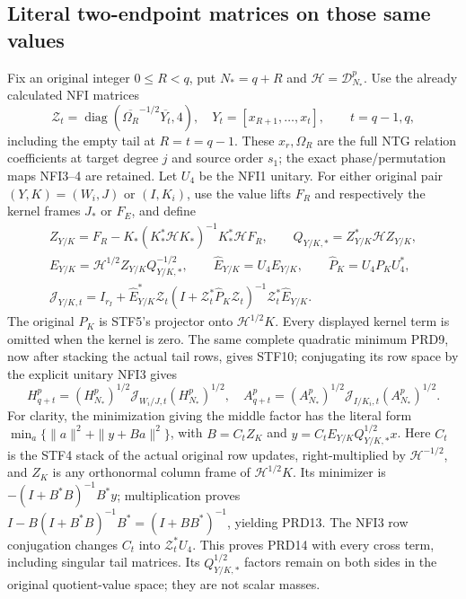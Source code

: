 \documentclass[11pt,a4paper]{article}
\begin{document}
\subsection{Literal two-endpoint matrices on those same values}
Fix an original integer $0\le R<q$, put $N_*=q+R$ and
$\mathcal H=\mathcal D_{N_*}^p$. Use the already calculated
NFI matrices
\[
 \mathscr Z_t=\operatorname{diag}
 (\overline{\Omega_R}^{-1/2}\overline{Y_t},4),\quad
 Y_t=[x_{R+1},\ldots,x_t],\qquad t=q-1,q,                 \tag{PRD12}
\]
including the empty tail at $R=t=q-1$. These $x_r,\Omega_R$
are the full NTG relation coefficients at target degree $j$ and
source order $s_1$; the exact phase/permutation maps NFI3--4 are
retained. Let $U_4$ be the NFI1 unitary. For either original
pair $(Y,K)=(W_i,J)$ or $(I,K_i)$, use the value lifts $F_R$
and respectively the kernel frames $J_*$ or $F_E$, and define
\[
\begin{gathered}
 Z_{Y/K}=F_R-K_*(K_*^*\mathcal H K_*)^{-1}K_*^*\mathcal H F_R,
 \qquad Q_{Y/K,*}=Z_{Y/K}^*\mathcal H Z_{Y/K},\\
 E_{Y/K}=\mathcal H^{1/2}Z_{Y/K}Q_{Y/K,*}^{-1/2},\qquad
 \widehat E_{Y/K}=U_4E_{Y/K},\qquad
 \widehat P_K=U_4P_KU_4^*,\\
 \mathcal J_{Y/K,t}=I_{r_I}+
 \widehat E_{Y/K}^*\mathscr Z_t
 (I+\mathscr Z_t^*\widehat P_K\mathscr Z_t)^{-1}
 \mathscr Z_t^*\widehat E_{Y/K} .
\end{gathered}                                                    \tag{PRD13}
\]
The original $P_K$ is STF5's projector onto $\mathcal H^{1/2}K$.
Every displayed kernel term is omitted when the kernel is zero.
The same complete quadratic minimum PRD9, now after stacking the
actual tail rows, gives STF10; conjugating its row space by the
explicit unitary NFI3 gives
\[
 H_{q+t}^p=(H_{N_*}^p)^{1/2}\mathcal J_{W_i/J,t}(H_{N_*}^p)^{1/2},
 \quad
 A_{q+t}^p=(A_{N_*}^p)^{1/2}\mathcal J_{I/K_i,t}(A_{N_*}^p)^{1/2}.
                                                               \tag{PRD14}
\]
For clarity, the minimization giving the middle factor has the
literal form $\min_a\{\|a\|^2+\|y+Ba\|^2\}$, with
$B=C_t Z_K$ and $y=C_tE_{Y/K}Q_{Y/K,*}^{1/2}x$.
Here $C_t$ is the STF4 stack of the actual original row updates,
right-multiplied by $\mathcal H^{-1/2}$, and $Z_K$ is any
orthonormal column frame of $\mathcal H^{1/2}K$.
Its minimizer is $-(I+B^*B)^{-1}B^*y$; multiplication proves
$I-B(I+B^*B)^{-1}B^*=(I+BB^*)^{-1}$, yielding PRD13.
The NFI3 row conjugation changes $C_t$ into $\mathscr Z_t^*U_4$.
This proves PRD14 with every cross term, including singular tail
matrices. Its $Q_{Y/K,*}^{1/2}$ factors remain on both sides in
the original quotient-value space; they are not scalar masses.
\end{document}
